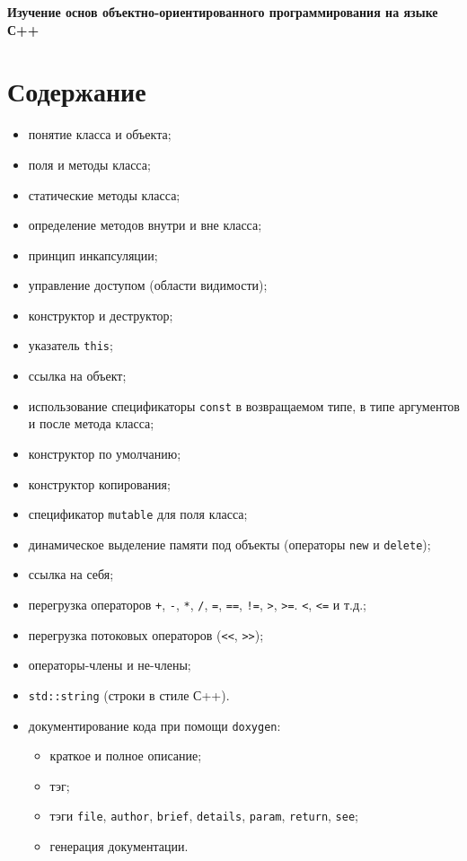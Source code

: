 \documentclass[a4paper,12pt]{article}
\begin{document}
\textbf{Изучение основ объектно-ориентированного программирования на
  языке С++}

\section{Содержание}

\begin{itemize}
\item понятие класса и объекта;
\item поля и методы класса;
\item статические методы класса;
\item определение методов внутри и вне класса;
\item принцип инкапсуляции;
\item управление доступом (области видимости);
\item конструктор и деструктор;
\item указатель \lstinline|this|;
\item ссылка на объект;
\item использование спецификаторы \lstinline|const| в возвращаемом
  типе, в типе аргументов и после метода класса;
\item конструктор по умолчанию;
\item конструктор копирования;
\item спецификатор \lstinline|mutable| для поля класса;
\item динамическое выделение памяти под объекты (операторы
  \lstinline|new| и \lstinline|delete|);
\item ссылка на себя;
\item перегрузка операторов \lstinline|+|, \lstinline|-|,
  \lstinline|*|, \lstinline|/|, \lstinline|=|, \lstinline|==|,
  \lstinline|!=|, \lstinline|>|, \lstinline|>=|. \lstinline|<|,
  \lstinline|<=| и т.д.;
\item перегрузка потоковых операторов (\lstinline|<<|,
  \lstinline|>>|);
\item операторы-члены и не-члены;
\item \lstinline|std::string| (строки в стиле С++).
\item документирование кода при помощи \verb|doxygen|:
  \begin{itemize}
  \item краткое и полное описание;
  \item тэг;
  \item тэги \verb|file|, \verb|author|, \verb|brief|, \verb|details|,
    \verb|param|, \verb|return|, \verb|see|;
  \item генерация документации.
  \end{itemize}
\end{itemize}
\end{document}
